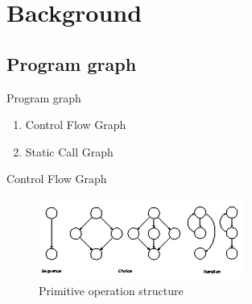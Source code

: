 \documentclass{beamer}
\begin{document}

%
% 

%
\section{Background}
\subsection{Program graph}
\begin{frame}{Program graph}
    \begin{enumerate}
        \item Control Flow Graph
        \item Static Call Graph
    \end{enumerate}
\end{frame}


\begin{frame}{Control Flow Graph}
    \begin{figure}
        \includegraphics[width=.8\paperwidth]{figure/Primitive-Operation-Structure}
        \caption{Primitive operation structure \parencite{McCabe1976}}
        \label{fig:primitivestructure}
    \end{figure}
\end{frame}
\end{document}

